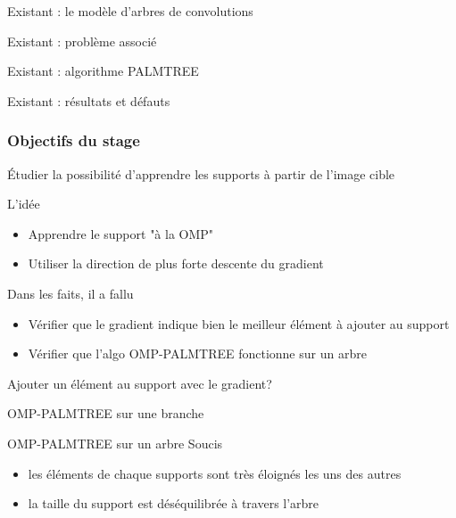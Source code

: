 
\begin{frame}{Existant : le modèle d'arbres de convolutions}
\end{frame}


\begin{frame}{Existant : problème associé}
\end{frame}


\begin{frame}{Existant : algorithme PALMTREE}
\end{frame}


\begin{frame}{Existant : résultats et défauts}
\end{frame}

\begin{frame}
	\frametitle{Objectifs du stage}
	Étudier la possibilité d'apprendre les supports à partir de l'image cible
\end{frame}



\begin{frame}{L'idée}
\begin{itemize}
	\item Apprendre le support "à la OMP"
	\item Utiliser la direction de plus forte descente du gradient
\end{itemize}
Dans les faits, il a fallu
\begin{itemize}
	\item Vérifier que le gradient indique bien le meilleur élément à ajouter au support
	\item Vérifier que l'algo OMP-PALMTREE fonctionne sur un arbre
\end{itemize}
\end{frame}


\begin{frame}{Ajouter un élément au support avec le gradient?}
\end{frame}


\begin{frame}{OMP-PALMTREE sur une branche}
\end{frame}


\begin{frame}{OMP-PALMTREE sur un arbre}
Soucis
\begin{itemize}
	\item les éléments de chaque supports sont très éloignés les uns des autres
	\item la taille du support est déséquilibrée à travers l'arbre
\end{itemize}
\end{frame}


